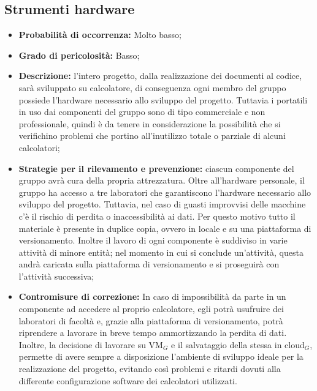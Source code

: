 \subsection{Strumenti hardware}
\begin{itemize}
\item \textbf{Probabilità di occorrenza:} Molto basso;
\item \textbf{Grado di pericolosità:} Basso;
\item \textbf{Descrizione:} l'intero progetto, dalla realizzazione dei documenti al codice, sarà sviluppato su calcolatore, di conseguenza ogni membro del gruppo possiede l'hardware necessario allo sviluppo del progetto. Tuttavia i portatili in uso dai componenti del gruppo sono di tipo commerciale e non professionale, quindi è da tenere in considerazione la possibilità che si verifichino problemi che portino all'inutilizzo totale o parziale di alcuni calcolatori;
\item \textbf{Strategie per il rilevamento e prevenzione:} ciascun componente del gruppo avrà cura della propria attrezzatura. Oltre all'hardware personale, il gruppo ha accesso a tre laboratori che garantiscono l'hardware necessario allo sviluppo del progetto. Tuttavia, nel caso di guasti improvvisi delle macchine c'è il rischio di perdita o inaccessibilità ai dati. Per questo motivo tutto il materiale è presente in duplice copia, ovvero in locale e su una piattaforma di versionamento. Inoltre il lavoro di ogni componente è suddiviso in varie attività di minore entità; nel momento in cui si conclude un'attività, questa andrà caricata sulla piattaforma di versionamento e si proseguirà con l'attività successiva; 
\item \textbf{Contromisure di correzione:} In caso di impossibilità da parte in un componente ad accedere al proprio calcolatore, egli potrà usufruire dei laboratori di facoltà e, grazie alla piattaforma di versionamento, potrà riprendere a lavorare in breve tempo ammortizzando la perdita di dati. Inoltre, la decisione di lavorare su VM$_G$ e il salvataggio della stessa in cloud$_G$, permette di avere sempre a disposizione l'ambiente di sviluppo ideale per la realizzazione del progetto, evitando così problemi e ritardi dovuti alla differente configurazione software dei calcolatori utilizzati.
\end{itemize}

